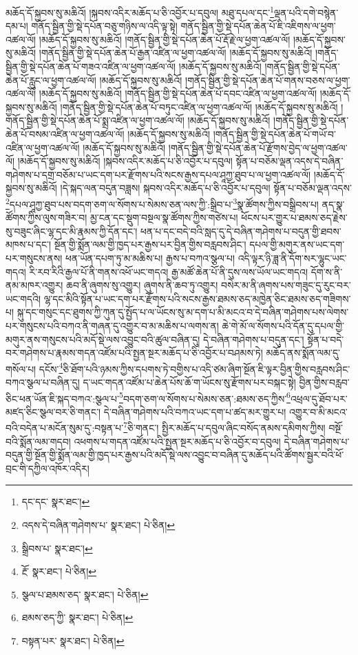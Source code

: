 མཆོད་དོ་སྐྱབས་སུ་མཆིའོ། །སྐབས་འདིར་མཆོད་པ་ཅི་འབྱོར་པ་དབུལ། མཐུ་དཔལ་དང་\footnote{དང་དང་  སྣར་ཐང་། }ལྡན་པའི་དགེ་བསྙེན་དམ་པ། གནོད་སྦྱིན་གྱི་སྡེ་དཔོན་བཅུ་གཉིས་ལ་འདི་ལྟ་སྟེ། གནོད་སྦྱིན་གྱི་སྡེ་དཔོན་ཆེན་པོ་ཇི་འཇིགས་ལ་ཕྱག་འཚལ་ལོ། །མཆོད་དོ་སྐྱབས་སུ་མཆིའོ། །གནོད་སྦྱིན་གྱི་སྡེ་དཔོན་ཆེན་པོ་རྡོ་རྗེ་ལ་ཕྱག་འཚལ་ལོ། །མཆོད་དོ་སྐྱབས་སུ་མཆིའོ། །གནོད་སྦྱིན་གྱི་སྡེ་དཔོན་ཆེན་པོ་རྒྱན་འཛིན་ལ་ཕྱག་འཚལ་ལོ། །མཆོད་དོ་སྐྱབས་སུ་མཆིའོ། །གནོད་སྦྱིན་གྱི་སྡེ་དཔོན་ཆེན་པོ་གཟའ་འཛིན་ལ་ཕྱག་འཚལ་ལོ། །མཆོད་དོ་སྐྱབས་སུ་མཆིའོ། །གནོད་སྦྱིན་གྱི་སྡེ་དཔོན་ཆེན་པོ་རླུང་ལ་ཕྱག་འཚལ་ལོ། །མཆོད་དོ་སྐྱབས་སུ་མཆིའོ། །གནོད་སྦྱིན་གྱི་སྡེ་དཔོན་ཆེན་པོ་གནས་བཅས་ལ་ཕྱག་འཚལ་ལོ། །མཆོད་དོ་སྐྱབས་སུ་མཆིའོ། །གནོད་སྦྱིན་གྱི་སྡེ་དཔོན་ཆེན་པོ་དབང་འཛིན་ལ་ཕྱག་འཚལ་ལོ། །མཆོད་དོ་སྐྱབས་སུ་མཆིའོ། །གནོད་སྦྱིན་གྱི་སྡེ་དཔོན་ཆེན་པོ་བཏུང་འཛིན་ལ་ཕྱག་འཚལ་ལོ། །མཆོད་དོ་སྐྱབས་སུ་མཆིའོ། །གནོད་སྦྱིན་གྱི་སྡེ་དཔོན་ཆེན་པོ་སྨྲ་འཛིན་ལ་ཕྱག་འཚལ་ལོ། །མཆོད་དོ་སྐྱབས་སུ་མཆིའོ། །གནོད་སྦྱིན་གྱི་སྡེ་དཔོན་ཆེན་པོ་བསམ་འཛིན་ལ་ཕྱག་འཚལ་ལོ། །མཆོད་དོ་སྐྱབས་སུ་མཆིའོ། །གནོད་སྦྱིན་གྱི་སྡེ་དཔོན་ཆེན་པོ་གཡོ་བ་འཛིན་ལ་ཕྱག་འཚལ་ལོ། །མཆོད་དོ་སྐྱབས་སུ་མཆིའོ། །གནོད་སྦྱིན་གྱི་སྡེ་དཔོན་ཆེན་པོ་རྫོགས་བྱེད་ལ་ཕྱག་འཚལ་ལོ། །མཆོད་དོ་སྐྱབས་སུ་མཆིའོ། །སྐབས་འདིར་མཆོད་པ་ཅི་འབྱོར་པ་དབུལ། སྟོན་པ་བཅོམ་ལྡན་འདས་དེ་བཞིན་གཤེགས་པ་དགྲ་བཅོམ་པ་ཡང་དག་པར་རྫོགས་པའི་སངས་རྒྱས་དཔལ་ཤཱཀྱ་ཐུབ་པ་ལ་ཕྱག་འཚལ་ལོ། །མཆོད་དོ་སྐྱབས་སུ་མཆིའོ། །དེ་སྐད་ལན་བདུན་བཟླས། སྐབས་འདིར་མཆོད་པ་ཅི་འབྱོར་པ་དབུལ། སྟོན་པ་བཅོམ་ལྡན་འདས་\footnote{འདས་དེ་བཞིན་གཤེགས་པ་  སྣར་ཐང་།  པེ་ཅིན། }དཔལ་ཤཱཀྱ་ཐུབ་པས་བདག་ཅག་ལ་སོགས་པ་སེམས་ཅན་ལས་ཀྱི་:སྒྲིབ་པ་\footnote{སྒྲིབས་པ་  སྣར་ཐང་། }སྣ་ཚོགས་ཀྱིས་བསྒྲིབས་པ། ནད་སྣ་ཚོགས་ཀྱིས་ལུས་གཟིར་བ། མྱ་ངན་དང་སྡུག་བསྔལ་སྣ་ཚོགས་ཀྱིས་གཙེས་པ། ཕོངས་པར་གྱུར་པ་ཐམས་ཅད་རྗེས་སུ་བཟུང་ཞིང་ལྷ་དང་མི་རྣམས་ཀྱི་དོན་དང་། ཕན་པ་དང་བདེ་བའི་སླད་དུ་དེ་བཞིན་གཤེགས་པ་བདུན་གྱི་ཐབས་མཁས་པ་དང་། སྔོན་གྱི་སྨོན་ལམ་གྱི་ཁྱད་པར་རྒྱས་པར་བྱིན་གྱིས་བརླབས་ཤིང་། དཔལ་གྱི་མགུར་ནས་ཡང་དག་པར་གསུངས་ནས། ཕན་ཡོན་དཔག་ཏུ་མ་མཆིས་པ། རྒྱས་པ་བཀའ་སྩལ་པ། འདི་ལྟར་ཉི་ཟླ་ནི་དོག་སར་ལྷུང་ཡང་གདའ། རི་རབ་རིའི་རྒྱལ་པོ་ནི་གནས་འཕོ་ཡང་གདའ། རྒྱ་མཚོ་ཆེན་པོ་ནི་དུས་ལས་ཡོལ་ཡང་གདའ། དོག་ས་ནི་ནམ་མཁར་འགྱུར། ཆབ་ནི་ཞུགས་སུ་འགྱུར། ཞུགས་ནི་ཆབ་ཏུ་འགྱུར། བསེར་མ་ནི་ཞགས་པས་གཟུང་དུ་རུང་བར་ཡང་གདའི། ལྷ་དང་མིའི་སྟོན་པ་ཡང་དག་པར་རྫོགས་པའི་སངས་རྒྱས་ཐམས་ཅད་མཁྱེན་ཅིང་ཐམས་ཅད་གཟིགས་པ། སྐུ་དང་གསུང་དང་ཐུགས་ཀྱི་ཀུན་དུ་སྤྱོད་པ་ལ་ཡོངས་སུ་མ་དག་པ་མི་མངའ་བ་དེ་བཞིན་གཤེགས་པས་ལེགས་པར་གསུངས་པའི་བཀའ་ནི་གཞན་དུ་འགྱུར་བ་མ་མཆིས་པ་ལགས་ན། ཆེ་གེ་མོ་ལ་སོགས་པའི་དོན་དུ་དཔལ་གྱི་མགུར་ནས་གསུངས་པའི་མདོ་སྡེ་ལས་འབྱུང་བའི་ཚུལ་བཞིན་དུ། དེ་བཞིན་གཤེགས་པ་བདུན་དང་། སྟོན་པ་བདེ་བར་གཤེགས་པ་རྣམས་གདན་འཛོམ་པའི་སྤྱན་སྔར་མཆོད་པ་ཅི་འབྱོར་པ་བཤམས་ཏེ། མཆོད་ནས་སྨོན་ལམ་དུ་གསོལ་པ། དངོས་\footnote{རྔོ་  སྣར་ཐང་།  པེ་ཅིན། }ཅི་ཐོག་པའི་ཉམས་ཀྱིས་དཔགས་ཏེ་བགྱིས་པ་འདི་ཙམ་ཞིག་སྔོན་ཇི་ལྟར་བྱིན་གྱིས་བརླབས་ཤིང་བཀའ་སྩལ་པ་བཞིན་དུ། ད་ཡང་གདན་འཛོམ་པ་ཆེན་པོས་ཆོ་ག་ཡོངས་སུ་རྫོགས་པར་བསྐང་སྟེ། བྱིན་གྱིས་བརླབ་ཅིང་ཕན་ཡོན་ཇི་སྐད་བཀའ་:སྩལ་པ་\footnote{སྩལ་པ་ཐམས་ཅད་  སྣར་ཐང་།  པེ་ཅིན། }བདག་ཅག་ལ་སོགས་པ་སེམས་ཅན་:ཐམས་ཅད་ཀྱིས་\footnote{ཐམས་ཅད་ཀྱི་  སྣར་ཐང་།  པེ་ཅིན། }འཕྲལ་དུ་ཐོབ་པར་མཛད་ཅིང་སྩལ་བར་ཅི་གནང་། དེ་བཞིན་གཤེགས་པའི་བཀའ་ཡང་དག་པ་ཚད་མར་གྱུར་པ། འགྱུར་བ་མི་མངའ་བའི་བདེན་པ་མངོན་སུམ་དུ་:བསྟན་པ་\footnote{བསྟན་པར་  སྣར་ཐང་།  པེ་ཅིན། }ཅི་གནང་། སྤྱིར་མཆོད་པ་དབུལ་ཞིང་བསོད་ནམས་དམིགས་ཀྱིས། བསྔོ་བའི་སྨོན་ལམ་གདབ། འཕགས་པ་གདན་འཛོམ་པའི་སྤྱན་སྔར་མཆོད་པ་ཅི་འབྱོར་བ་དབུལ། དེ་བཞིན་གཤེགས་པ་བདུན་གྱི་སྔོན་གྱི་སྨོན་ལམ་གྱི་ཁྱད་པར་རྒྱས་པའི་མདོ་སྡེ་ལས་འབྱུང་བ་བཞིན་དུ་མཆོད་པའི་ཚོགས་སྦྱར་བའི་ཕོ་བྲང་གི་དཀྱིལ་འཁོར་འདིར། 